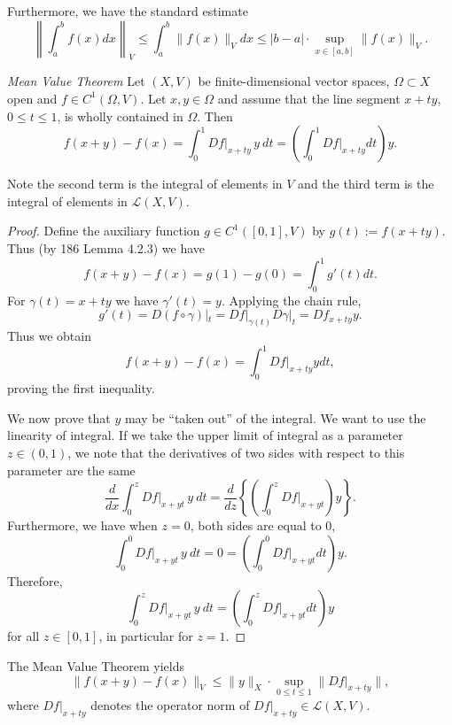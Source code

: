 \documentclass[10pt]{article}
\renewcommand{\L}{\mathcal{L}}
\begin{document}
  Furthermore, we have the standard estimate
  \[
    \left\|\int_{a}^{b}f(x)dx\right\|_{V} \leq \int_{a}^{b}\|f(x)\|_{V}dx  \leq |b-a| \cdot \mathop{\sup}_{x \in [a,b]} \|f(x)\|_{V}.  
  \]

  \begin{theorem}
    \textit{Mean Value Theorem} Let $(X,V)$ be finite-dimensional vector spaces, $\Omega \subset X$ open and 
    $f \in C^{1}(\Omega, V)$. Let $x,y \in \Omega$ and assume that the line segment $x + ty$, $0 \leq t \leq 1$,
    is wholly contained in $\Omega$. Then
    \begin{equation}
      f(x+y)-f(x) = \int_{0}^{1}Df|_{x+ty}\,y~dt = \left(\int_{0}^{1}Df|_{x+ty}dt\right)y.
    \end{equation}
  \end{theorem}    

  \begin{remark}
    Note the second term is the integral of elements in $V$ and the third term is the integral of elements in $\L(X,V)$.
  \end{remark}

  \begin{proof}
    Define the auxiliary function $g \in C^{1}([0,1], V)$ by $g(t) := f(x + ty)$.
    Thus (by 186 Lemma 4.2.3) we have
    \[
      f(x+y) - f(x) = g(1) - g(0) = \int_{0}^{1}g'(t)dt.  
    \]
    For $\gamma(t) = x + ty$ we have $\gamma'(t) = y$. Applying the chain rule,
    \[
      g'(t) = D(f \circ \gamma)|_{t} = Df|_{\gamma(t)}D\gamma|_{t} = Df_{x+ty}y.  
    \]
    Thus we obtain
    \[
      f(x+y) - f(x) = \int_{0}^{1}Df|_{x+ty}ydt,  
    \]
    proving the first inequality.

    We now prove that $y$ may be ``taken out'' of the integral. We want to use the linearity of integral.
    If we take the upper limit of integral as a parameter $z \in (0,1)$, we note that the derivatives of 
    two sides with respect to this parameter are the same
    \[
      \frac{d}{dx}\int_{0}^{z}Df|_{x+yt}\,y~dt = \frac{d}{dz}\left\{\left(\int_{0}^{z}Df|_{x+yt}\right)y\right\}.  
    \]
    Furthermore, we have when $z = 0$, both sides are equal to $0$,
    \[
      \int_{0}^{0}Df|_{x+yt}\,y~dt = 0 = \left(\int_{0}^{0}Df|_{x+yt}dt\right)y.  
    \]
    Therefore,
    \[
      \int_{0}^{z}Df|_{x+yt}\,y~dt = \left(\int_{0}^{z}Df|_{x+yt}dt\right)y 
    \]
    for all $z \in [0,1]$, in particular for $z = 1$.
  \end{proof}

  \begin{remark}
    The Mean Value Theorem yields
      \[
      \|f(x+y)-f(x)\|_{V} \leq \|y\|_{X} \cdot \mathop{\sup}_{0 \leq t \leq 1}\|Df|_{x+ty}\|,  
    \]
    where $Df|_{x+ty}$ denotes the operator norm of $Df|_{x+ty} \in \L(X,V)$.
  \end{remark}
\end{document}
